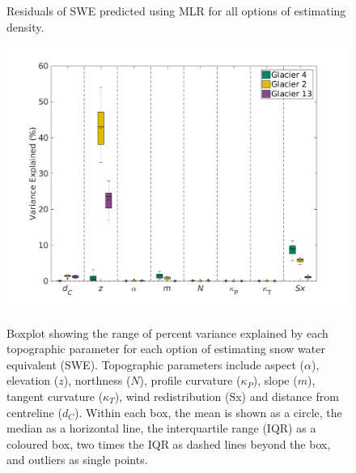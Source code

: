 \documentclass[12pt]{article}
\begin{document}
\begin{figure}[H]
	\caption{Residuals of SWE predicted using MLR for all options of estimating density.}
	\label{fig:MLRresiduals_all}
\end{figure}
\begin{figure}[H]
	\centering
	\includegraphics[width =1.1 \textwidth]{Coeffs_DensityOpts.png}\\
	\caption{Boxplot showing the range of percent variance explained by each topographic parameter for each option of estimating snow water equivalent (SWE). Topographic parameters include aspect ($\alpha$), elevation ($z$), northness ($N$), profile curvature ($\kappa_P$), slope ($m$), tangent curvature ($\kappa_T$), wind redistribution (Sx) and distance from centreline ($d_C$). Within each box, the mean is shown as a circle, the median as a horizontal line, the interquartile range (IQR) as a coloured box, two times the IQR as dashed lines beyond the box, and outliers as single points.}
	\label{fig:MLRPercentVar_densityOptions}
\end{figure} 
\end{document}
